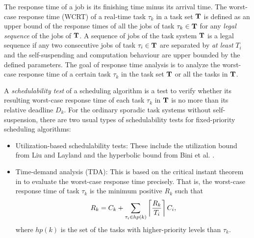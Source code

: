 The response time of a job is its finishing time minus its arrival
time.  The worst-case response time (WCRT) of a real-time task
$\tau_k$ in a task set ${\bf T}$ is defined as an upper bound of the
response times of all the jobs of task $\tau_k \in {\bf T}$ for any
\emph{legal sequence} of the jobs of ${\bf T}$. A sequence of jobs of
the task system ${\bf T}$ is a legal sequence if any two consecutive
jobs of task $\tau_i \in {\bf T}$ are separated by \emph{at least}
$T_i$ and the self-suspending and computation behaviour are upper
bounded by the defined parameters. The goal of response time analysis is to
analyze the worst-case response time of a certain task $\tau_k$ in the
task set ${\bf T}$ or all the tasks in ${\bf T}$.

A \emph{schedulability test} of a scheduling algorithm is a test to
verify whether its resulting worst-case response time of each task
$\tau_k$ in ${\bf T}$ is no more than its relative deadline $D_k$. For
the ordinary sporadic task systems without self-suspension, there are
two usual types of schedulability tests for fixed-priority scheduling
algorithms:
\begin{itemize}
\item Utilization-based schedulability tests: These include the
  utilization bound from Liu and Layland \cite{Liu_1973}  and the
  hyperbolic bound from Bini et al. \cite{bini2003rate}.
\item Time-demand analysis (TDA): This is based on the critical instant
  theorem in
  \cite{Liu_1973} to evaluate the worst-case response time
  precisely. That is, the worst-case response time of task $\tau_k$ is
  the minimum positive $R_k$ such that
  \[
  R_k = C_k+ \sum_{\tau_i \in hp(k)}\left\lceil{\frac{R_k}{T_i}}\right\rceil C_i, 
  \]
  where $hp(k)$ is the set of the tasks with higher-priority levels
  than $\tau_k$.  
\end{itemize}








  
  
  